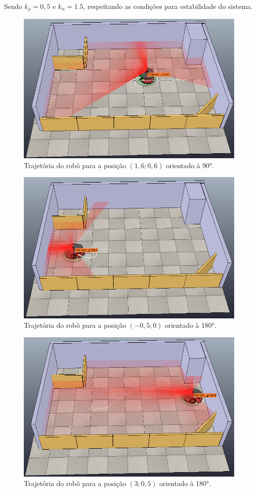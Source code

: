 Sendo $k_\rho = 0,5$ e $k_\alpha = 1.5$, respeitando as condições para estabilidade do sistema.


\begin{figure}[H]
	\centering
	\includegraphics[width=0.6\linewidth]{img/4-1}
	\caption{Trajetória do robô para a posição $(1,6; 0,6)$ orientado à 90°.}
	\label{fig:4-1}
\end{figure}



\begin{figure}[H]
	\centering
	\includegraphics[width=0.6\linewidth]{img/4-2}
	\caption{Trajetória do robô para a posição $(-0,5; 0)$ orientado à 180°.}
	\label{fig:4-2}
\end{figure}


\begin{figure}[H]
	\centering
	\includegraphics[width=0.6\linewidth]{img/4-3}
	\caption{Trajetória do robô para a posição $(3; 0,5)$ orientado à 180°.}
	\label{fig:4-3}
\end{figure}

